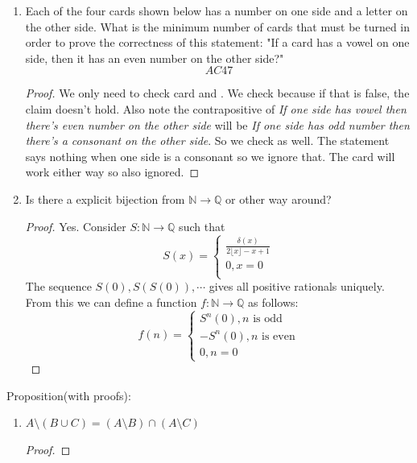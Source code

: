 \documentclass[11pt, a4paper]{article}
\begin{document}
\begin{Day}
\item  \begin{enumerate}
    \item Each of the four cards shown below has a number on one side and a letter on the other side. What is the minimum number of cards that must be turned in order to prove the correctness of this statement: "If a card has a vowel on one side, then it has an even number on the other side?" 
     $$\boxed{A} \boxed{C} \boxed{4} \boxed{7}$$
    \begin{proof}
        We only need to check card  and . We check  because if that is false, the claim doesn't hold. Also note the contrapositive of \textit{If one side has vowel then there's even number on the other side} will be \textit{If one side has odd number then there's a consonant on the other side}. So we check  as well. The statement says nothing when one side is a consonant so we ignore that. The  card will work either way so also ignored.
    \end{proof}
    \item Is there a explicit bijection from $\mathbb{N} \rightarrow \mathbb{Q}$ or other way around?
    \begin{proof}
        Yes. Consider $S:\mathbb{N} \to \mathbb{Q}$ such that
        $$S(x)=\begin{cases}
          \frac{\delta(x)}{2\lfloor x \rfloor - x + 1}\\
          0,x=0\\
        \end{cases}$$
        The sequence $S(0),S(S(0)),\cdots $ gives all positive rationals uniquely. \\
        From this we can define a function $f:\mathbb{N} \to \mathbb{Q}$ as follows: $$f(n)=\begin{cases}
          S^n(0), n \text{ is odd}\\
          -S^n(0), n \text{ is even}\\
          0, n=0
        \end{cases}$$
    \end{proof}
\end{enumerate}
\item  Proposition(with proofs):\begin{enumerate}
  \item  $A\setminus (B\cup C)=(A\setminus B)\cap (A\setminus C)$
  \begin{proof}


\end{proof}
\end{enumerate}
\end{Day}
\end{document}
